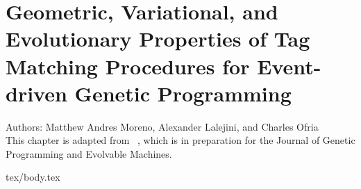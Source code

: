\chapter{Geometric, Variational, and Evolutionary Properties of Tag Matching Procedures for Event-driven Genetic Programming}
\label{ch:tag-matching}

\noindent
Authors: Matthew Andres Moreno, Alexander Lalejini, and Charles Ofria \\
This chapter is adapted from ~\citep{moreno2021matchmaker}, which is in preparation for the Journal of Genetic Programming and Evolvable Machines.

{tex/body.tex}
